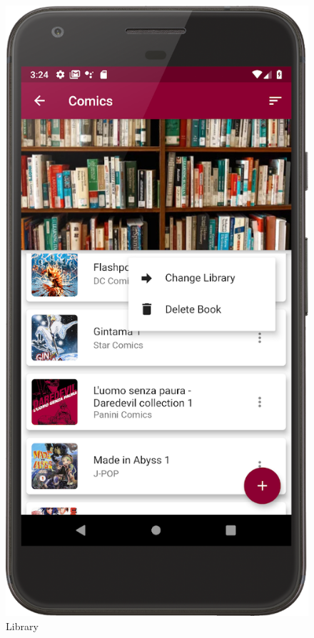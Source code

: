 \begin{figure}[!htb]
    \hfill
    \begin{minipage}[b]{0.3\textwidth}
        \centering
        \includegraphics[scale=0.09]{images/library-page.png}
        \caption{Library}
        \label{ref:librarypage}
    \end{minipage}

\end{figure}
